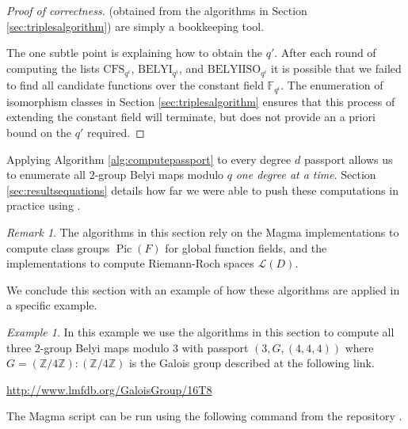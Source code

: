 \documentclass{dcthesis}
\newcommand{\ZZ}{\mathbb Z}
\newcommand{\mm}[1]{{\color{blue} \sf MM: [#1]}}
\newcommand{\FF}{\mathbb{F}}
\DeclareMathOperator{\Pic}{Pic}
\numberwithin{equation}{section}
\theoremstyle{definition}
\theoremstyle{remark}
\newtheorem{remark}[equation]{Remark}
\newtheorem{example}[equation]{Example}
\begin{document}
{{{\begin{proof}[Proof of correctness]
      (obtained from the algorithms in Section
      \ref{sec:triplesalgorithm})
      are simply a bookkeeping tool.
      \par
      The one subtle point is
      explaining how to obtain
      the $q'$.
      After each round of computing
      the lists
      $\mathrm{CFS}_{q^i}$,
      $\mathrm{BELYI}_{q^i}$,
      and
      $\mathrm{BELYIISO}_{q^i}$
      it is possible that
      we failed to find all candidate functions
      over the constant field
      $\FF_{q^i}$.
      The enumeration of isomorphism classes
      in Section
      \ref{sec:triplesalgorithm}
      ensures that this process of
      extending the constant field will
      terminate,
      but does not provide an
      a priori bound on the $q'$
      required.
    \end{proof}
    Applying Algorithm
    \ref{alg:computepassport}
    to every degree $d$ passport
    allows us to enumerate all
    $2$-group Belyi maps modulo $q$
    \emph{one degree at a time}.
    Section \ref{sec:resultsequations}
    details how far we were able to push
    these computations in practice
    using \cite{twogroupdessins}.
    \begin{remark}
      \label{rmk:computationalremarks}
      The algorithms in this section rely
      on the \textsf{Magma}
      implementations to compute
      class groups $\Pic(F)$
      for global function fields,
      and the implementations
      to compute Riemann-Roch spaces
      $\mathscr{L}(D)$.
    \end{remark}
    We conclude this section
    with an example of how these
    algorithms are applied in a specific
    example.
    \begin{example}
      \label{exm:equationsinmagma}
      In this example we use the algorithms
      in this section to compute
      all three
      $2$-group Belyi maps modulo $3$
      with passport $(3,G,(4,4,4))$
      where $G = (\ZZ/4\ZZ) : (\ZZ/4\ZZ)$
      is the Galois group described
      at the following link.
      \begin{center}
        \url{http://www.lmfdb.org/GaloisGroup/16T8}
      \end{center}
      The \textsf{Magma} script can be run
      using the following command
      from the repository \cite{twogroupdessins}.
      \begin{code}

\end{code}
\end{example}}}}
\end{document}
